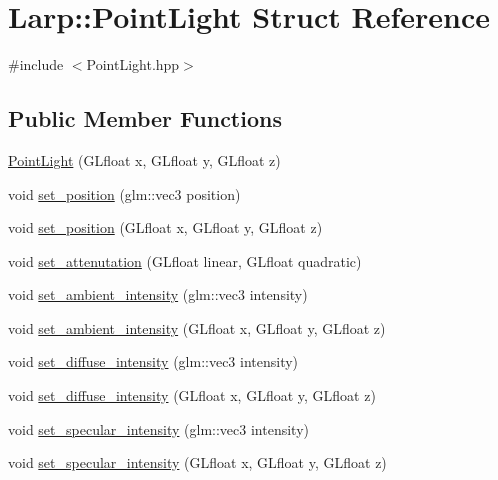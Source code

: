 \hypertarget{structLarp_1_1PointLight}{}\section{Larp\+:\+:Point\+Light Struct Reference}
\label{structLarp_1_1PointLight}


{\ttfamily \#include $<$Point\+Light.\+hpp$>$}

\subsection*{Public Member Functions}
\begin{DoxyCompactItemize}
\item 
\hyperlink{structLarp_1_1PointLight_a9354363c883907f4a0a6b36ad325fb8c}{Point\+Light} (G\+Lfloat x, G\+Lfloat y, G\+Lfloat z)
\item 
void \hyperlink{structLarp_1_1PointLight_a54cd0a3042a6708deb4469799e581dd9}{set\+\_\+position} (glm\+::vec3 position)
\item 
void \hyperlink{structLarp_1_1PointLight_aadb279beeb80306fc7d120b9376c3979}{set\+\_\+position} (G\+Lfloat x, G\+Lfloat y, G\+Lfloat z)
\item 
void \hyperlink{structLarp_1_1PointLight_a41c79c3645d746f61cb687f743dfd8bd}{set\+\_\+attenutation} (G\+Lfloat linear, G\+Lfloat quadratic)
\item 
void \hyperlink{structLarp_1_1PointLight_a845bdd0c79e69fa6e131d0db51d3b33d}{set\+\_\+ambient\+\_\+intensity} (glm\+::vec3 intensity)
\item 
void \hyperlink{structLarp_1_1PointLight_aec21b9af880ff56b6297b39bde20c8c3}{set\+\_\+ambient\+\_\+intensity} (G\+Lfloat x, G\+Lfloat y, G\+Lfloat z)
\item 
void \hyperlink{structLarp_1_1PointLight_a3cf8caa9ff04713bac601a97608256ec}{set\+\_\+diffuse\+\_\+intensity} (glm\+::vec3 intensity)
\item 
void \hyperlink{structLarp_1_1PointLight_a549815b8167ec8c3ab6968a61db4b77e}{set\+\_\+diffuse\+\_\+intensity} (G\+Lfloat x, G\+Lfloat y, G\+Lfloat z)
\item 
void \hyperlink{structLarp_1_1PointLight_aaa4bdda9203f793b63c9e9c4bf6b1053}{set\+\_\+specular\+\_\+intensity} (glm\+::vec3 intensity)
\item 
void \hyperlink{structLarp_1_1PointLight_aecbe89839ccacc49222abdaf43e5134e}{set\+\_\+specular\+\_\+intensity} (G\+Lfloat x, G\+Lfloat y, G\+Lfloat z)
\end{DoxyCompactItemize}
